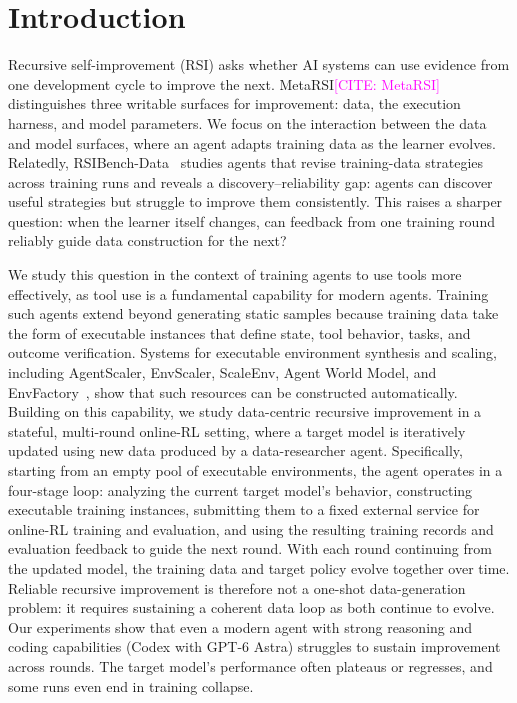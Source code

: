 \section{Introduction}
\label{sec:intro}




Recursive self-improvement (RSI) asks whether AI systems can use evidence from one development cycle to improve the next. MetaRSI\textcolor{magenta}{[CITE: MetaRSI]} distinguishes three writable surfaces for improvement: data, the execution harness, and model parameters. We focus on the interaction between the data and model surfaces, where an agent adapts training data as the learner evolves. Relatedly, RSIBench-Data~\citep{rsibenchdata} studies agents that revise training-data strategies across training runs and reveals a discovery--reliability gap: agents can discover useful strategies but struggle to improve them consistently. This raises a sharper question: when the learner itself changes, can feedback from one training round reliably guide data construction for the next?

We study this question in the context of training agents to use tools more effectively, as tool use is a fundamental capability for modern agents. Training such agents extend beyond generating static samples because training data take the form of executable instances that define state, tool behavior, tasks, and outcome verification. Systems for executable environment synthesis and scaling, including AgentScaler, EnvScaler, ScaleEnv, Agent World Model, and EnvFactory~\citep{agentscaler,envscaler,scaleenv,awm,envfactory}, show that such resources can be constructed automatically. Building on this capability, we study data-centric recursive improvement in a stateful, multi-round online-RL setting, where a target model is iteratively updated using new data produced by a data-researcher agent. Specifically, starting from an empty pool of executable environments, the agent operates in a four-stage loop: analyzing the current target model's behavior, constructing executable training instances, submitting them to a fixed external service for online-RL training and evaluation, and using the resulting training records and evaluation feedback to guide the next round. With each round continuing from the updated model, the training data and target policy evolve together over time. Reliable recursive improvement is therefore not a one-shot data-generation problem: it requires sustaining a coherent data loop as both continue to evolve. Our experiments show that even a modern agent with strong reasoning and coding capabilities (Codex with GPT-6 Astra) struggles to sustain improvement across rounds. The target model's performance often plateaus or regresses, and some runs even end in training collapse.

